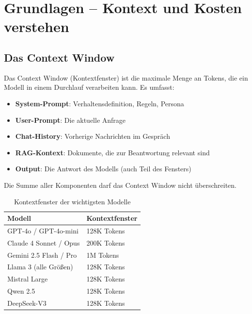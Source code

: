 \section{Grundlagen -- Kontext und Kosten verstehen}

\subsection{Das Context Window}

Das Context Window (Kontextfenster) ist die maximale Menge an Tokens,
die ein Modell in einem Durchlauf verarbeiten kann. Es umfasst:

\begin{itemize}[leftmargin=*]
    \item \textbf{System-Prompt}: Verhaltensdefinition, Regeln, Persona
    \item \textbf{User-Prompt}: Die aktuelle Anfrage
    \item \textbf{Chat-History}: Vorherige Nachrichten im Gespräch
    \item \textbf{RAG-Kontext}: Dokumente, die zur Beantwortung relevant sind
    \item \textbf{Output}: Die Antwort des Modells (auch Teil des Fensters)
\end{itemize}

Die Summe aller Komponenten darf das Context Window nicht überschreiten.

\begin{table}[H]
\centering
\begin{tabularx}{\linewidth}{lX}
\toprule
\textbf{Modell} & \textbf{Kontextfenster} \\
\midrule
GPT-4o / GPT-4o-mini & 128K Tokens \\
Claude 4 Sonnet / Opus & 200K Tokens \\
Gemini 2.5 Flash / Pro & 1M Tokens \\
Llama 3 (alle Größen) & 128K Tokens \\
Mistral Large & 128K Tokens \\
Qwen 2.5 & 128K Tokens \\
DeepSeek-V3 & 128K Tokens \\
\bottomrule
\end{tabularx}
\caption{Kontextfenster der wichtigsten Modelle}
\end{table}

